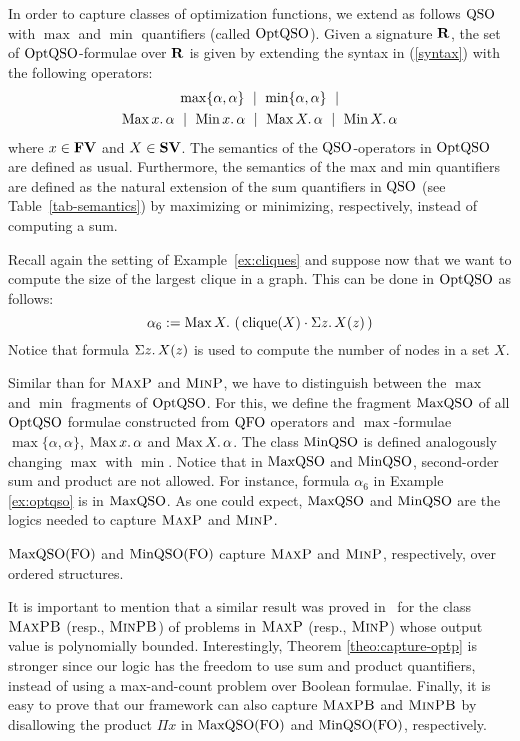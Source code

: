 In order to capture classes of optimization functions, we extend as follows ${\rm QSO}$ with $\max$ and $\min$ quantifiers (called ${\rm OptQSO}$). 
Given a signature $\mathbf{R}$, the set of ${\rm OptQSO}$-formulae over $\mathbf{R}$ is given by extending the syntax in (\ref{syntax}) with the following operators:
\begin{multline*}
\max\{\alpha,\alpha\} \ \mid\ \min\{\alpha,\alpha\} \ \mid \\ \maxa{x} \alpha \ \mid \ \mina{x} \alpha \ \mid \ \maxa{X} \alpha \ \mid \ \mina{X} \alpha 
\end{multline*}
where $x \in \mathbf{FV}$ and $X \in \mathbf{SV}$. The semantics of the ${\rm QSO}$-operators in ${\rm OptQSO}$ are defined as usual. Furthermore, the semantics of the max and min quantifiers are defined as the natural extension of the sum quantifiers in ${\rm QSO}$ (see Table~\ref{tab-semantics}) by maximizing or minimizing, respectively, instead of computing a sum. 
\begin{example}\label{ex:optqso}
	Recall again the setting of Example~\ref{ex:cliques} and suppose now that we want to compute the size of the largest clique in a graph. This can be done in ${\rm OptQSO}$ as follows:
	\[
\alpha_6 := \operatorname{Max}{X}.\, \left( \, \operatorname{clique}(X) \cdot \Sigma{z}.\, X(z)  \, \right)
	\]
	Notice that formula $\Sigma{z}.\, X(z)$ is used to compute the number of nodes in a set $X$. 
\end{example}
Similar than for $\text{\sc MaxP}$ and $\text{\sc MinP}$, we have to distinguish between the $\max$ and $\min$ fragments of ${\rm OptQSO}$. For this, we define the fragment ${\rm MaxQSO}$ of all ${\rm OptQSO}$ formulae constructed from ${\rm QFO}$ operators and $\max$-formulae $\max\{\alpha,\alpha\}$, $\operatorname{Max}{x}.\, \alpha$ and  $\operatorname{Max}{X}.\, \alpha$.
The class ${\rm MinQSO}$ is defined analogously changing $\max$ with $\min$. Notice that in ${\rm MaxQSO}$ and ${\rm MinQSO}$, second-order sum and product are not allowed. For instance, formula $\alpha_6$ in Example \ref{ex:optqso} is in ${\rm MaxQSO}$.
As one could expect, ${\rm MaxQSO}$ and ${\rm MinQSO}$ are the logics needed to capture $\text{\sc MaxP}$ and $\text{\sc MinP}$.
\begin{theorem} \label{theo:capture-optp}
	${\rm MaxQSO}({\rm FO})$ and ${\rm MinQSO}({\rm FO})$ capture $\text{\sc MaxP}$ and $\text{\sc MinP}$, respectively, over ordered structures.
\end{theorem}
It is important to mention that a similar result was proved in~\cite{kolaitis1994logical} for the class $\text{\sc MaxPB}$ (resp., $\text{\sc MinPB}$) of problems in $\text{\sc MaxP}$ (resp., $\text{\sc MinP}$) whose output value is polynomially bounded.
Interestingly, Theorem \ref{theo:capture-optp} is stronger since our logic has the freedom to use sum and product quantifiers, instead of using a max-and-count problem over Boolean formulae. 
Finally, it is easy to prove that our framework can also capture $\text{\sc MaxPB}$ and $\text{\sc MinPB}$ by disallowing the product $\Pi x$ in ${\rm MaxQSO}({\rm FO})$ and ${\rm MinQSO}({\rm FO})$, respectively.

